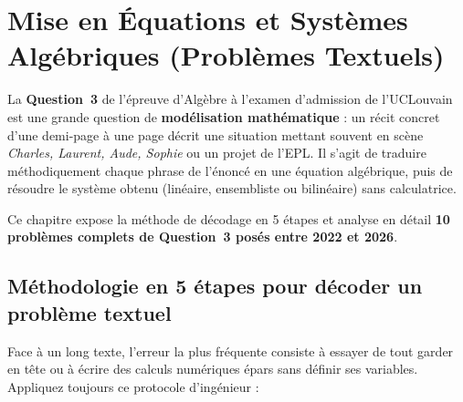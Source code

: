\chapter{Mise en Équations et Systèmes Algébriques (Problèmes Textuels)}

La \textbf{Question~3} de l'épreuve d'Algèbre à l'examen d'admission de l'UCLouvain est une grande question de \textbf{modélisation mathématique} : un récit concret d'une demi-page à une page décrit une situation mettant souvent en scène \emph{Charles, Laurent, Aude, Sophie} ou un projet de l'EPL. Il s'agit de traduire méthodiquement chaque phrase de l'énoncé en une équation algébrique, puis de résoudre le système obtenu (linéaire, ensembliste ou bilinéaire) sans calculatrice.

Ce chapitre expose la méthode de décodage en 5 étapes et analyse en détail \textbf{10 problèmes complets de Question~3 posés entre 2022 et 2026}.

\section{Méthodologie en 5 étapes pour décoder un problème textuel}

Face à un long texte, l'erreur la plus fréquente consiste à essayer de tout garder en tête ou à écrire des calculs numériques épars sans définir ses variables. Appliquez toujours ce protocole d'ingénieur :


